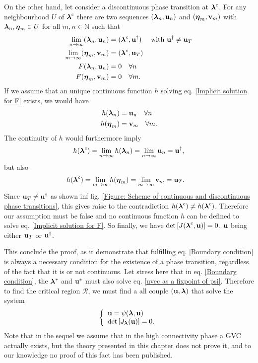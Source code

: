 \documentclass[
11pt, %
english, %
singlespacing, %
nolistspacing, %
liststotoc, %
headsepline, %
]{MastersDoctoralThesis} %
\begin{document}
On the other hand, let consider a discontinuous phase transition at $\boldsymbol{\mathrm{\lambda}}^c$. For any neighbourhood $U$ of $\boldsymbol{\mathrm{\lambda}}^c$ there are two sequences $(\boldsymbol{\mathrm{\lambda}}_n, \boldsymbol{\mathrm{u}}_n)$ and $(\boldsymbol{\mathrm{\eta}}_m, \boldsymbol{\mathrm{v}}_m)$ with $\boldsymbol{\mathrm{\lambda}}_n, \boldsymbol{\mathrm{\eta}}_m \in U$ for all $m, n \in \mathbb{N}$ such that
\begin{align}
	\lim_{n \rightarrow \infty} (\boldsymbol{\mathrm{\lambda}}_n, \boldsymbol{\mathrm{u}}_n) &= (\boldsymbol{\mathrm{\lambda}}^c, \boldsymbol{\mathrm{u}}^\dagger) \quad \text{ with } \boldsymbol{\mathrm{u}}^\dagger \neq \boldsymbol{\mathrm{u}}_T \\
	\lim_{m \rightarrow \infty} (\boldsymbol{\mathrm{\eta}}_m, \boldsymbol{\mathrm{v}}_m) &= (\boldsymbol{\mathrm{\lambda}}^c, \boldsymbol{\mathrm{u}}_T) \\
	F(\boldsymbol{\mathrm{\lambda}}_n, \boldsymbol{\mathrm{u}}_n) &= 0 \quad \forall n \\
	F(\boldsymbol{\mathrm{\eta}}_m, \boldsymbol{\mathrm{v}}_m) &= 0 \quad \forall m.
\end{align}
If we assume that an unique continuous function $h$ solving eq. \eqref{Implicit solution for F} exists, we would have
\begin{align}
	h(\boldsymbol{\mathrm{\lambda}}_n) &= \boldsymbol{\mathrm{u}}_n \quad \forall n \\
	h(\boldsymbol{\mathrm{\eta}}_m) &= \boldsymbol{\mathrm{v}}_m \quad \forall m.
\end{align}
The continuity of $h$ would furthermore imply
\begin{align}
	h(\boldsymbol{\mathrm{\lambda}}^c) = \lim_{n \rightarrow \infty} h(\boldsymbol{\mathrm{\lambda}}_n) = \lim_{n \rightarrow \infty} \boldsymbol{\mathrm{u}}_n = \boldsymbol{\mathrm{u}}^\dagger,
\end{align}
but also
\begin{align}
	h(\boldsymbol{\mathrm{\lambda}}^c) &= \lim_{m \rightarrow \infty} h(\boldsymbol{\mathrm{\eta}}_m) = \lim_{m \rightarrow \infty} \boldsymbol{\mathrm{v}}_m = \boldsymbol{\mathrm{u}}_T.
\end{align}
Since $\boldsymbol{\mathrm{u}}_T \neq \boldsymbol{\mathrm{u}}^\dagger$ as shown inf fig. \ref{Figure: Scheme of continuous and discontinuous phase transitions}, this gives raise to the contradiction $h(\boldsymbol{\mathrm{\lambda}}^c) \neq h(\boldsymbol{\mathrm{\lambda}}^c)$. Therefore our assumption must be false and no continuous function $h$ can be defined to solve eq. \eqref{Implicit solution for F}. So finally, we have $\det\left[ J(\boldsymbol{\mathrm{\lambda}}^c, \boldsymbol{\mathrm{u}}) \right] = 0$, $\boldsymbol{\mathrm{u}}$ being either $\boldsymbol{\mathrm{u}}_T$ or $\boldsymbol{\mathrm{u}}^\dagger$.

This conclude the proof, as it demonstrate that fulfilling eq. \eqref{Boundary condition} is always a necessary condition for the existence of a phase transition, regardless of the fact that it is or not continuous. Let stress here that in eq. \eqref{Boundary condition}, the $\boldsymbol{\mathrm{\lambda}}^*$ and $\boldsymbol{\mathrm{u}}^*$ must also solve eq. \eqref{uvec as a fixpoint of psi}. Therefore to find the critical region $\mathcal{R}$, we must find a all couple $(\boldsymbol{\mathrm{u}}, \boldsymbol{\mathrm{\lambda}})$ that solve the system
\begin{align}
	\left\{ \begin{array}{l} \boldsymbol{\mathrm{u}} = \psi(\boldsymbol{\mathrm{\lambda}}, \boldsymbol{\mathrm{u}}) \\ \det\left[ J_{\boldsymbol{\mathrm{\lambda}}}(\boldsymbol{\mathrm{u}}) \right] = 0. \end{array} \right. \label{Boundary condition full system}
\end{align}
Note that in the sequel we assume that in the high connectivity phase a GVC actually exists, but the theory presented in this chapter does not prove it, and to our knowledge no proof of this fact has been published.
\end{document}
